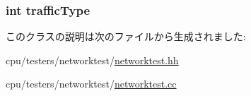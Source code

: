 \label{classNetworkTest_aa36b8e894416f0ec98f701ab08f2ac22}
\hypertarget{classNetworkTest_a4230ca40857c8ef75f071969601cdaa8}{
\subsubsection[{trafficType}]{\setlength{\rightskip}{0pt plus 5cm}int {\bf trafficType}}}
\label{classNetworkTest_a4230ca40857c8ef75f071969601cdaa8}


このクラスの説明は次のファイルから生成されました:\begin{DoxyCompactItemize}
\item 
cpu/testers/networktest/\hyperlink{networktest_8hh}{networktest.hh}\item 
cpu/testers/networktest/\hyperlink{networktest_8cc}{networktest.cc}\end{DoxyCompactItemize}
